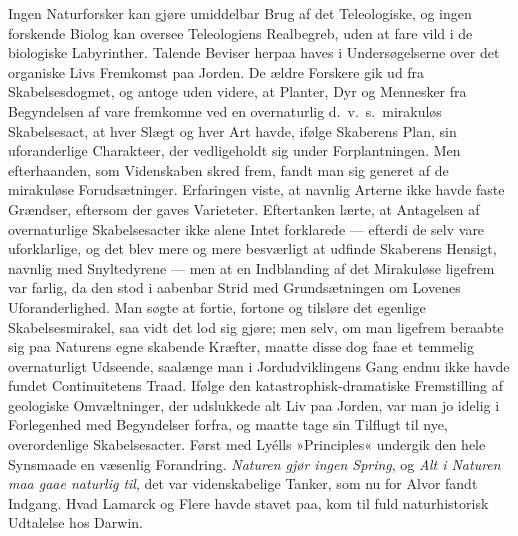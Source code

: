 \documentclass[12pt]{book}
\newcommand{\apage}[1]{\marginnote{\footnotesize\textit{[#1]}}}
\begin{document}
\noindent Ingen Naturforsker kan gjøre umiddelbar Brug af det
Teleologiske, og ingen forskende Biolog kan oversee Teleologiens
Realbegreb, uden at fare vild i de biologiske Labyrinther. Talende Beviser
herpaa haves i Undersøgelserne over det organiske Livs Fremkomst paa
Jorden. De ældre Forskere gik ud fra Skabelsesdogmet, og antoge uden
videre, at Planter, Dyr og Mennesker fra Begyndelsen af vare fremkomne ved
en overnaturlig d.\ v.\ s.\ mirakuløs Skabelsesact, at hver Slægt og hver Art
havde, ifølge Skaberens Plan, sin uforanderlige Charakteer, der vedligeholdt
sig under Forplantningen. Men efterhaanden, som Videnskaben skred frem,
fandt man sig generet af de mirakuløse Forudsætninger. Erfaringen viste, at
navnlig Arterne ikke havde faste Grændser, eftersom der gaves Varieteter.
Eftertanken lærte, at Antagelsen af overnaturlige Skabelsesacter ikke alene
Intet forklarede --- efterdi de selv vare uforklarlige, og det blev mere og
mere besværligt at udfinde Skaberens Hensigt, navnlig med
\apage{196} Snyltedyrene --- men
at en Indblanding af det Mirakuløse ligefrem var farlig, da den stod i
aabenbar Strid med Grundsætningen om Lovenes Uforanderlighed. Man søgte at
fortie, fortone og tilsløre det egenlige Skabelsesmirakel, saa vidt det lod
sig gjøre; men selv, om man ligefrem beraabte sig paa Naturens egne skabende
Kræfter, maatte disse dog faae et temmelig overnaturligt Udseende, saalænge
man i Jordudviklingens Gang endnu ikke havde fundet Continuitetens Traad.
Ifølge den katastrophisk-dramatiske Fremstilling af geologiske
Omvæltninger, der udslukkede alt Liv paa Jorden, var man jo idelig i
Forlegenhed med Begyndelser forfra, og maatte tage sin Tilflugt til nye,
overordenlige Skabelsesacter. Først med Lyélls »Principles« undergik den
hele Synsmaade en væsenlig Forandring. \emph{Naturen gjør ingen Spring}, og \emph{Alt i
Naturen maa gaae naturlig til}, det var videnskabelige Tanker, som nu for
Alvor fandt Indgang. Hvad Lamarck og Flere havde stavet paa, kom til fuld
naturhistorisk Udtalelse hos Darwin.
\end{document}
